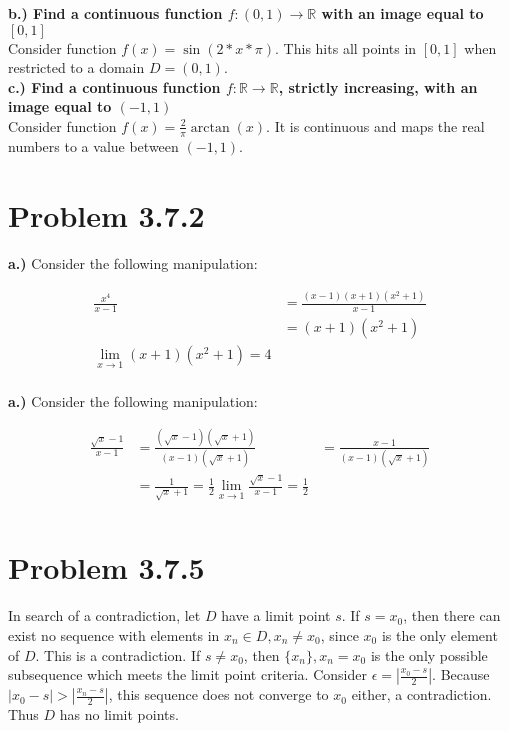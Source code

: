 \documentclass[10pt]{article} %
\begin{document}
\textbf{b.) Find a continuous function $f:(0,1)\rightarrow\mathbb{R}$ with an image equal to $[0,1]$}\\
Consider function $f(x) = \sin(2*x*\pi)$. This hits all points in $[0,1]$ when restricted to a domain $D = (0,1)$.\\

\textbf{c.) Find a continuous function $f:\mathbb{R}\rightarrow\mathbb{R}$, strictly increasing, with an image equal to $(-1,1)$}\\
Consider function $f(x) = \frac{2}{\pi}\arctan(x)$. It is continuous and maps the real numbers to a value between $(-1,1)$.\\

\section{Problem 3.7.2}
\textbf{a.)} Consider the following manipulation:

\begin{align*}
  \frac{x^4}{x-1} &= \frac{(x-1)(x+1)(x^2+1)}{x-1}\\
  &= (x+1)(x^2+1)\\
  \lim_{x \rightarrow 1} (x+1)(x^2+1) = 4\\
\end{align*}

\textbf{a.)} Consider the following manipulation:

\begin{align*}
  \frac{\sqrt{x}-1}{x-1} &= \frac{(\sqrt{x}-1)(\sqrt{x}+1)}{(x-1)(\sqrt{x}+1)}
  &= \frac{x-1}{(x-1)(\sqrt{x}+1)}\\
  &= \frac{1}{\sqrt{x}+1} = \frac{1}{2}
  \lim_{x \rightarrow 1} \frac{\sqrt{x}-1}{x-1} = \frac{1}{2}\\
\end{align*}

\section{Problem 3.7.5}
In search of a contradiction, let $D$ have a limit point $s$. If $s = x_0$, then there can exist no sequence with elements in $x_n \in D, x_n \neq x_0$, since $x_0$ is the only element of $D$. This is a contradiction. If $s \neq x_0$, then $\{x_n\}, x_n = x_0$ is the only possible subsequence which meets the limit point criteria. Consider $\epsilon = \left|\frac{x_0 - s}{2}\right|$. Because $|x_0 - s| > \left|\frac{x_n - s}{2}\right|$, this sequence does not converge to $x_0$ either, a contradiction. Thus $D$ has no limit points.\\
\end{document}
